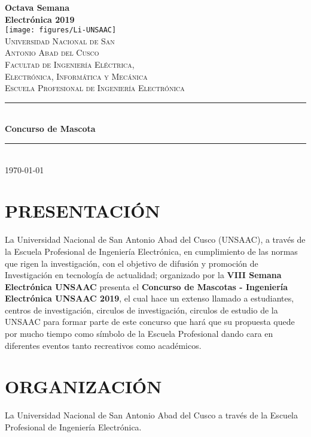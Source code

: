 \documentclass{article}
\newcommand\BackgroundPic{%
\put(0,0){%
\parbox[b][\paperheight]{\paperwidth}{%
\vfill
\centering
\texttt{[image: figures/back]}%
\vfill
}}}
\begin{document}
\AddToShipoutPicture*{\BackgroundPic}
\begin{titlepage}
\newcommand{\HRule}{\rule{\linewidth}{0.5mm}} 
\center
{\Huge \bfseries Octava Semana \\ Electrónica 2019} \\[1cm]
\texttt{[image: figures/Li-UNSAAC]}\\[1cm]
\textsc{\LARGE  Universidad Nacional de San \\[0.2cm] Antonio Abad del Cusco}\\[0.4cm] 
\textsc{\Large Facultad de Ingeniería Eléctrica, \\ Electrónica, Informática y Mecánica}\\[0.4cm] 
\textsc{\large Escuela Profesional de Ingeniería Electrónica}\\[0.4cm]
\HRule \\[0.4cm]
{ \huge \bfseries Concurso de Mascota}\\[0.3cm] 
\HRule \\[1.5cm]
\today
\end{titlepage}



\newpage
\noindent
\normalfont

\section{PRESENTACIÓN}
\normalfont

La Universidad Nacional de San Antonio Abad del Cusco (UNSAAC), a través de la Escuela Profesional de Ingeniería Electrónica, en cumplimiento de las normas que rigen la investigación, con el objetivo de difusión y promoción de Investigación en tecnología de actualidad; organizado por la \textbf{VIII Semana Electrónica UNSAAC} presenta el \textbf{Concurso de Mascotas - Ingeniería Electrónica UNSAAC 2019}, el cual hace un extenso llamado a estudiantes, centros de investigación, circulos de investigación, circulos de estudio de la UNSAAC para formar parte de este concurso que hará que su propuesta quede por mucho tiempo como símbolo de la Escuela Profesional dando cara en diferentes eventos tanto recreativos como académicos.

\section{ORGANIZACIÓN}

La Universidad Nacional de San Antonio Abad del Cusco a través de la Escuela Profesional de Ingeniería Electrónica.
\end{document}
